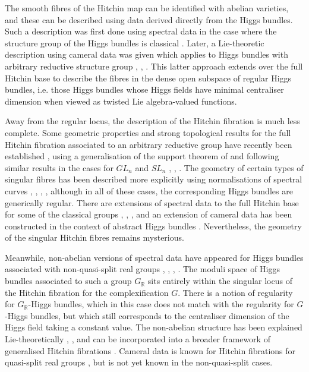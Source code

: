 \documentclass{amsart}
\theoremstyle{remark}
\numberwithin{theorem}{section}
\numberwithin{equation}{section}
\begin{document}
The smooth fibres of the Hitchin map can be identified with abelian varieties, and these can be described using data derived directly from the Higgs bundles. Such a description was first done using spectral data in the case where the structure group of the Higgs bundles is classical \cite{Hitchin2}. Later, a Lie-theoretic description using cameral data was given which applies to Higgs bundles with arbitrary reductive structure group \cite{Faltings}, \cite{Scognamillo}, \cite{DG}. This latter approach extends over the full Hitchin base to describe the fibres in the dense open subspace of regular Higgs bundles, i.e. those Higgs bundles whose Higgs fields have minimal centraliser dimension when viewed as twisted Lie algebra-valued functions. 

Away from the regular locus, the description of the Hitchin fibration is much less complete. Some geometric properties and strong topological results for the full Hitchin fibration associated to an arbitrary reductive group have recently been established \cite{dCFFHM}, using a generalisation of the support theorem of \cite{Ngo2} and following similar results in the cases for $GL_n$ and $SL_n$ \cite{CL}, \cite{deCataldo}, \cite{MS}. The geometry of certain types of singular fibres has been described more explicitly using normalisations of spectral curves \cite{Hitchin4}, \cite{Horn1}, \cite{Horn2}, \cite{FraPN}, although in all of these cases, the corresponding Higgs bundles are generically regular. There are extensions of spectral data to the full Hitchin base for some of the classical groups \cite{BNR}, \cite{Schaub}, \cite{Carbone}, and an extension of cameral data has been constructed in the context of abstract Higgs bundles \cite{Pantev}. Nevertheless, the geometry of the singular Hitchin fibres remains mysterious.

Meanwhile, non-abelian versions of spectral data have appeared for Higgs bundles associated with non-quasi-split real groups \cite{HS}, \cite{Branco}, \cite{BS}, \cite{BBS}. The moduli space of Higgs bundles associated to such a group $G_\mathbb{R}$ sits entirely within the singular locus of the Hitchin fibration for the complexification $G$. There is a notion of regularity for $G_\mathbb{R}$-Higgs bundles, which in this case does not match with the regularity for $G$-Higgs bundles, but which still corresponds to the centraliser dimension of the Higgs field taking a constant value. The non-abelian structure has been explained Lie-theoretically \cite{GPPN}, \cite{HM}, and can be incorporated into a broader framework of generalised Hitchin fibrations \cite{Ngo3}. Cameral data is known for Hitchin fibrations for quasi-split real groups \cite{GPPN}, but is not yet known in the non-quasi-split cases.
\end{document}
